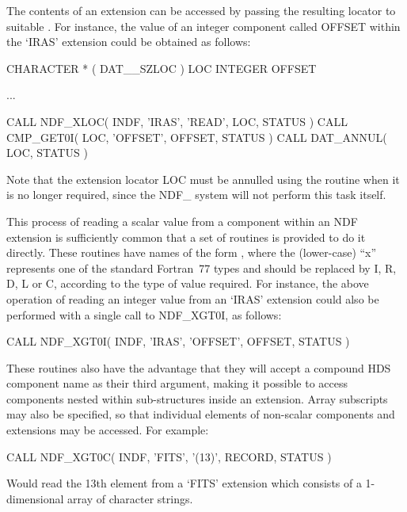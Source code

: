 \documentclass[twoside,11pt,nolof]{starlink}
\begin{document}
The contents of an extension can be accessed by passing the resulting
locator to suitable .
For instance, the value of an integer component called OFFSET within the
`IRAS' extension could be obtained as follows:

\small
\begin{terminalv}
      CHARACTER * ( DAT__SZLOC ) LOC
      INTEGER OFFSET

      ...

      CALL NDF_XLOC( INDF, 'IRAS', 'READ', LOC, STATUS )
      CALL CMP_GET0I( LOC, 'OFFSET', OFFSET, STATUS )
      CALL DAT_ANNUL( LOC, STATUS )
\end{terminalv}
\normalsize

Note that the extension locator LOC must be annulled using the routine
 when it is no longer required,
since the NDF\_ system will not perform this task itself.

This process of reading a scalar value from a component within an NDF
extension is sufficiently common that a set of routines is provided to do it
directly.
These routines have names of the form , where the (lower-case)
``x'' represents one of the standard Fortran~77 types and should be replaced
by I, R, D, L or C, according to the type of value required.
For instance, the above operation of reading an integer value from an `IRAS'
extension could also be performed with a single call to NDF\_XGT0I, as
follows:

\small
\begin{terminalv}
      CALL NDF_XGT0I( INDF, 'IRAS', 'OFFSET', OFFSET, STATUS )
\end{terminalv}
\normalsize

These routines also have the advantage that they will accept a
compound HDS component name as their third argument, making it
possible to access components nested within sub-structures inside an
extension. Array subscripts may also be specified, so that individual
elements of non-scalar components and extensions may be accessed. For
example:

\small
\begin{terminalv}
      CALL NDF_XGT0C( INDF, 'FITS', '(13)', RECORD, STATUS )
\end{terminalv}
\normalsize

Would read the 13th element from a `FITS' extension which consists of
a 1-dimensional array of character strings.
\end{document}
